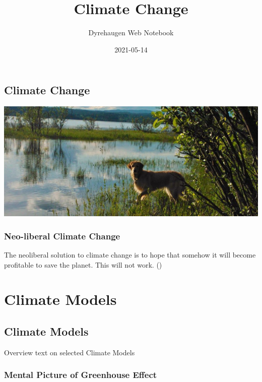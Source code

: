 \documentclass[
]{book}
\title{Climate Change}
\author{Dyrehaugen Web Notebook}
\date{2021-05-14}
\begin{document}
\maketitle

{
\setcounter{tocdepth}{1}
\tableofcontents
}
\hypertarget{climate-change}{%
\chapter{Climate Change}\label{climate-change}}

\includegraphics{fig/zelda.jpg}

\hypertarget{neo-liberal-climate-change}{%
\section{Neo-liberal Climate Change}\label{neo-liberal-climate-change}}

The neoliberal solution to climate change is to hope
that somehow it will become profitable to save the planet.
This will not work.
(\citet{ExistentialComics})

\hypertarget{part-climate-models}{%
\part{Climate Models}\label{part-climate-models}}

\hypertarget{climate-models}{%
\chapter{Climate Models}\label{climate-models}}

Overview text on selected Climate Models

\hypertarget{mental-picture-of-greenhouse-effect}{%
\section{Mental Picture of Greenhouse Effect}\label{mental-picture-of-greenhouse-effect}}
\end{document}
